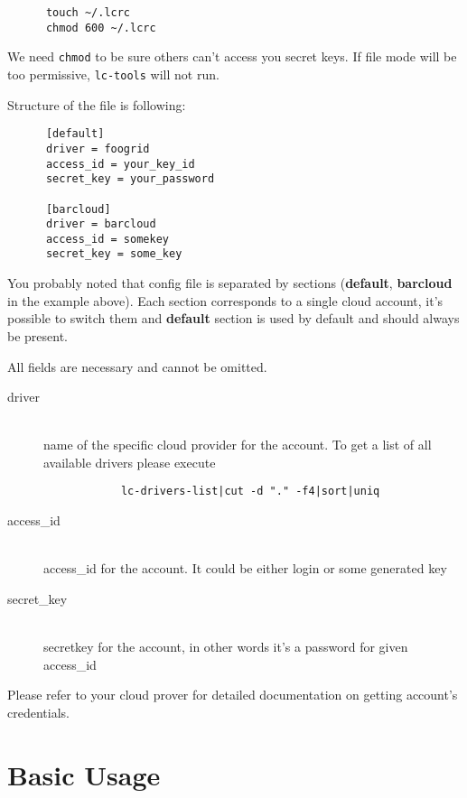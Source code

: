 \documentclass[a4paper]{report}
\begin{document}
      \begin{verbatim}
      touch ~/.lcrc
      chmod 600 ~/.lcrc
      \end{verbatim}

      We need {\tt chmod} to be sure others can't access you secret keys. If file mode
      will be too permissive, {\tt lc-tools} will not run.

      Structure of the file is following:

      \begin{verbatim}
      [default]
      driver = foogrid
      access_id = your_key_id
      secret_key = your_password

      [barcloud]
      driver = barcloud
      access_id = somekey
      secret_key = some_key
      \end{verbatim}

      You probably noted that config file is separated by sections (\textbf{default},
      \textbf{barcloud} in the example above). Each section corresponds to a single
      cloud account, it's possible to switch them and \textbf{default} section is
      used by default and should always be present.

      All fields are necessary and cannot be omitted.

      \begin{description}
        \item[driver] \hfill \\
          name of the specific cloud provider for the account. To get a list of all
          available drivers please execute

          \begin{verbatim}
            lc-drivers-list|cut -d "." -f4|sort|uniq
          \end{verbatim}

        \item[access\_id] \hfill \\
          access\_id for the account. It could be either login or some generated key
        \item[secret\_key] \hfill \\
          secretkey for the account, in other words it's a password for given access\_id
      \end{description}

      Please refer to your cloud prover for detailed documentation on getting account's
      credentials.

      \section{Basic Usage}
\end{document}
